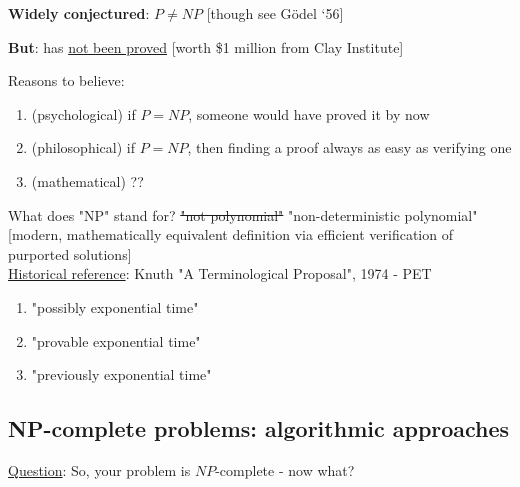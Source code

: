 \documentclass[a4paper,12pt]{article}
\theoremstyle{plain}
\theoremstyle{definition}
\theoremstyle{remark}
\begin{document}
\textbf{Widely conjectured}: $P \neq NP$ [though see G{\"o}del `56]

\textbf{But}: has \underline{not been proved} [worth \$1 million from Clay Institute]

Reasons to believe:
\begin{enumerate}
	\item (psychological) if $P=NP$, someone would have proved it by now
	\item (philosophical) if $P=NP$, then finding a proof always as easy as verifying one
	\item (mathematical) ??
\end{enumerate}

What does "NP" stand for? \sout{"not polynomial"} "non-deterministic polynomial" [modern, mathematically equivalent definition via efficient verification of purported solutions]
\\

\underline{Historical reference}: Knuth "A Terminological Proposal", 1974 - PET
\begin{enumerate}
	\item "possibly exponential time"
	\item "provable exponential time"
	\item "previously exponential time"
\end{enumerate}



\subsection{NP-complete problems: algorithmic approaches}
\underline{Question}: So, your problem is $NP$-complete - now what?
\\
\end{document}
